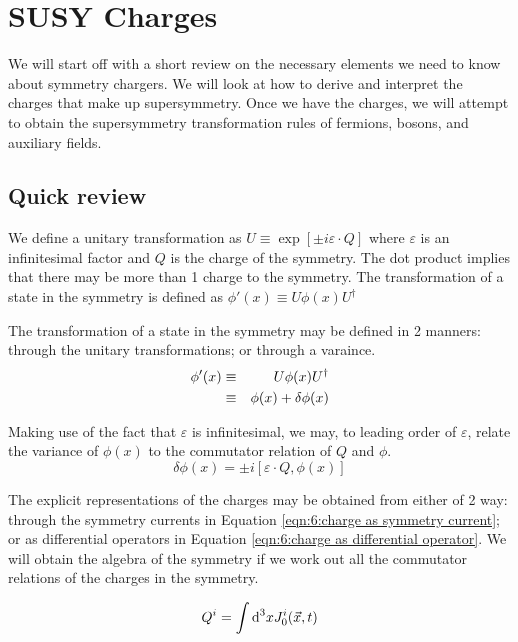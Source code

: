 \chapter{SUSY Charges}
\label{ch:6}

We will start off with a short review on the necessary elements we need to know about symmetry chargers. We will look at how to derive and interpret the charges that make up supersymmetry. Once we have the charges, we will attempt to obtain the supersymmetry transformation rules of fermions, bosons, and auxiliary fields.

\section{Quick review}
We define a unitary transformation as $U \equiv \exp[\pm i \varepsilon\cdot Q]$ where $\varepsilon$ is an infinitesimal factor and $Q$ is the charge of the symmetry. The dot product implies that there may be more than 1 charge to the symmetry. The transformation of a state in the symmetry is defined as $\phi'(x) \equiv U \phi(x) U^\dagger$

The transformation of a state in the symmetry may be defined in 2 manners: through the unitary transformations; or through a varaince.
\begin{eqnarray}
    \phi'(x) &\equiv& U \phi(x) U^\dagger \nonumber \\
    &\equiv& \phi(x) + \delta\phi(x) \nonumber
\end{eqnarray}

Making use of the fact that $\varepsilon$ is infinitesimal, we may, to leading order of $\varepsilon$, relate the variance of $\phi(x)$ to the commutator relation of $Q$ and $\phi$.
\begin{equation}
    \delta \phi(x) = \pm i [\varepsilon\cdot Q, \phi(x)]
    \label{eqn:6:charge and commutator relation}
\end{equation}

The explicit representations of the charges may be obtained from either of 2 way: through the symmetry currents in Equation \ref{eqn:6:charge as symmetry current}; or as differential operators in Equation \ref{eqn:6:charge as differential operator}. We will obtain the algebra of the symmetry if we work out all the commutator relations of the charges in the symmetry.

\begin{equation}
    Q^i = \int \td^3 x J_0^i(\Vec{x}, t)
    \label{eqn:6:charge as symmetry current}
\end{equation}

